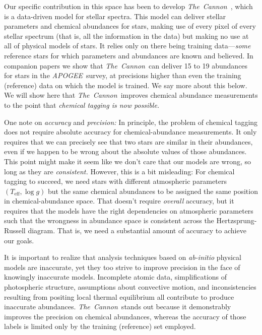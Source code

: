 \documentclass[12pt, letterpaper, preprint]{aastex}
\newcommand{\acronym}[1]{{\small{#1}}}
\newcommand{\project}[1]{\textsl{#1}}
\newcommand{\apogee}{\project{\acronym{APOGEE}}}
\newcommand{\thecannon}{\project{The~Cannon}}
\newcommand{\foreign}[1]{\textsl{#1}}
\newcommand{\teff}{T_{\mathrm{eff}}}
\newcommand{\logg}{\log g}
\begin{document}
Our specific contribution in this space has been to develop
\thecannon\ \citep{thecannon, ages}, which is a data-driven model for
stellar spectra.
This model can deliver stellar parameters and chemical abundances for
stars, making use of every pixel of every stellar spectrum (that is,
all the information in the data) but making no use at all of physical
models of stars.
It relies only on there being training data---\emph{some} reference stars for
which parameters and abundances are known and believed.
In companion papers \citep{casey16, ness16} we show that
\thecannon\ can deliver 15 to 19 abundances for stars in the
\apogee\ survey, at precisions higher than even the training (reference) data on
which the model is trained.
We say more about this below.
We will show here that \thecannon\ improves chemical abundance measurements
to the point that \emph{chemical tagging is now possible.}

One note on \emph{accuracy} and \emph{precision:}
In principle, the problem of chemical tagging does not require
absolute accuracy for chemical-abundance measurements.
It only requires that we can precisely see that two stars are similar
in their abundances, even if we happen to be wrong about the absolute values of
those abundances.
This point might make it seem like we don't care that our models are
wrong, so long as they are \emph{consistent.}
However, this is a bit misleading:
For chemical tagging to succeed, we need stars with different
atmospheric parameters $(\teff, \logg)$ but the same chemical
abundances to be assigned the same position in chemical-abundance
space.
That doesn't require \emph{overall} accuracy, but it requires that the models
have the right dependencies on atmospheric parameters such that the
wrongness in abundance space is consistent across the Hertzsprung-Russell diagram.
That is, we need a substantial amount of accuracy to achieve our goals.

It is important to realize that analysis techniques based on \foreign{ab-initio}
physical models are inaccurate, yet they too strive to improve precision
in the face of knowingly inaccurate models.  Incomplete atomic data, 
simplifications of photospheric structure, assumptions about convective
motion, and inconsistencies resulting from positing local thermal
equilibrium all contribute to produce inaccurate abundances.
\thecannon\ stands out because it demonstrably improves the precision on
chemical abundances, whereas the accuracy of those labels is limited only
by the training (reference) set employed.
\end{document}
